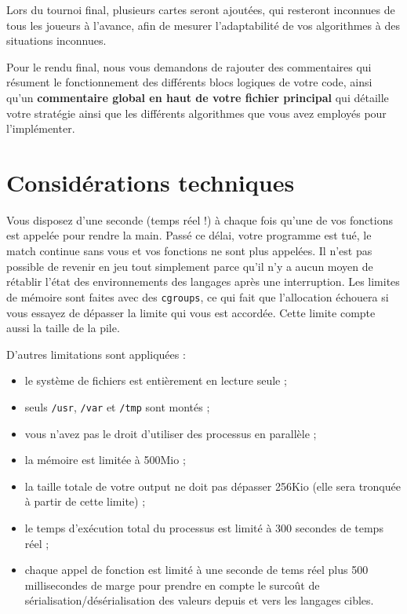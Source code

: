 Lors du tournoi final, plusieurs cartes seront ajoutées, qui resteront
inconnues de tous les joueurs à l'avance, afin de mesurer l'adaptabilité de
vos algorithmes à des situations inconnues.

Pour le rendu final, nous vous demandons de rajouter des commentaires qui
résument le fonctionnement des différents blocs logiques de votre code, ainsi
qu'un \textbf{commentaire global en haut de votre fichier principal} qui
détaille votre stratégie ainsi que les différents algorithmes que vous avez
employés pour l'implémenter.

\section{Considérations techniques}

Vous disposez d'une seconde (temps réel !) à chaque fois qu'une de vos
fonctions est appelée pour rendre la main. Passé ce délai, votre programme est
tué, le match continue sans vous et vos fonctions ne sont plus appelées. Il
n'est pas possible de revenir en jeu tout simplement parce qu'il n'y a aucun
moyen de rétablir l'état des environnements des langages après une
interruption.  Les limites de mémoire sont faites avec des \texttt{cgroups}, ce
qui fait que l'allocation échouera si vous essayez de dépasser la limite qui
vous est accordée. Cette limite compte aussi la taille de la pile.

D'autres limitations sont appliquées :

\begin{itemize}
    \item le système de fichiers est entièrement en lecture seule ;
    \item seuls \texttt{/usr}, \texttt{/var} et \texttt{/tmp} sont montés ;
    \item vous n'avez pas le droit d'utiliser des processus en parallèle ;
    \item la mémoire est limitée à 500Mio ;
    \item la taille totale de votre output ne doit pas dépasser 256Kio (elle
        sera tronquée à partir de cette limite) ;
    \item le temps d'exécution total du processus est limité à 300 secondes de
        temps réel ;
    \item chaque appel de fonction est limité à une seconde de tems réel plus
        500 millisecondes de marge pour prendre en compte le surcoût de
        sérialisation/désérialisation des valeurs depuis et vers les langages
        cibles.
\end{itemize}
